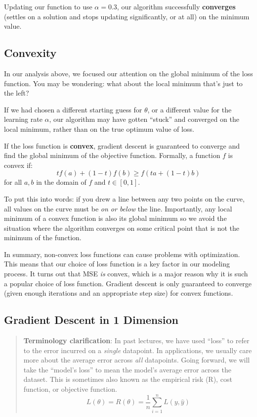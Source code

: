\documentclass[
  letterpaper,
  DIV=11,
  numbers=noendperiod]{scrreprt}
\begin{document}
Updating our function to use \(\alpha=0.3\), our algorithm successfully
\textbf{converges} (settles on a solution and stops updating
significantly, or at all) on the minimum value.

\subsection{Convexity}\label{convexity}

In our analysis above, we focused our attention on the global minimum of
the loss function. You may be wondering: what about the local minimum
that's just to the left?

If we had chosen a different starting guess for \(\theta\), or a
different value for the learning rate \(\alpha\), our algorithm may have
gotten ``stuck'' and converged on the local minimum, rather than on the
true optimum value of loss.

If the loss function is \textbf{convex}, gradient descent is guaranteed
to converge and find the global minimum of the objective function.
Formally, a function \(f\) is convex if:
\[tf(a) + (1-t)f(b) \geq f(ta + (1-t)b)\] for all \(a, b\) in the domain
of \(f\) and \(t \in [0, 1]\).

To put this into words: if you drew a line between any two points on the
curve, all values on the curve must be \emph{on or below} the line.
Importantly, any local minimum of a convex function is also its global
minimum so we avoid the situation where the algorithm converges on some
critical point that is not the minimum of the function.

In summary, non-convex loss functions can cause problems with
optimization. This means that our choice of loss function is a key
factor in our modeling process. It turns out that MSE \emph{is} convex,
which is a major reason why it is such a popular choice of loss
function. Gradient descent is only guaranteed to converge (given enough
iterations and an appropriate step size) for convex functions.

\subsection{Gradient Descent in 1
Dimension}\label{gradient-descent-in-1-dimension}

\begin{quote}
\textbf{Terminology clarification}: In past lectures, we have used
``loss'' to refer to the error incurred on a \emph{single} datapoint. In
applications, we usually care more about the average error across
\emph{all} datapoints. Going forward, we will take the ``model's loss''
to mean the model's average error across the dataset. This is sometimes
also known as the empirical risk (R), cost function, or objective
function.
\[L(\theta) = R(\theta) = \frac{1}{n} \sum_{i=1}^{n} L(y, \hat{y})\]
\end{quote}
\end{document}
